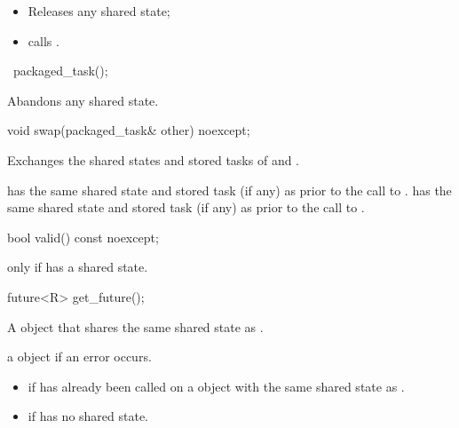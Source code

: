 \begin{itemdescr}
\pnum
\effects
\begin{itemize}
\item
Releases any shared state;
\item
calls .
\end{itemize}
\end{itemdescr}

%
\begin{itemdecl}
~packaged_task();
\end{itemdecl}

\begin{itemdescr}
\pnum
\effects
Abandons any shared state.
\end{itemdescr}

%
\begin{itemdecl}
void swap(packaged_task& other) noexcept;
\end{itemdecl}

\begin{itemdescr}
\pnum
\effects Exchanges the shared states and stored tasks of  and .

\pnum
\postconditions {} has the same shared state
and stored task (if any) as 
prior to the call to .  has the same shared state
and stored task (if any)
as  prior to the call to .
\end{itemdescr}

%
\begin{itemdecl}
bool valid() const noexcept;
\end{itemdecl}

\begin{itemdescr}
\pnum
\returns {} only if  has a shared state.
\end{itemdescr}

%
\begin{itemdecl}
future<R> get_future();
\end{itemdecl}

\begin{itemdescr}
\pnum
\returns A  object that shares the same shared state as .

\pnum
\throws a  object if an error occurs.

\pnum
\errors
\begin{itemize}
\item {} if  has already been called on
a  object with the same shared state as .
\item {} if  has no shared state.
\end{itemize}
\end{itemdescr}


